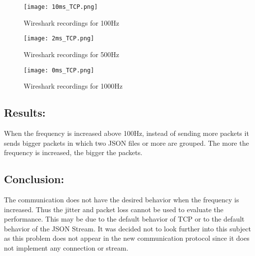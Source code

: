 	\begin{figure}[h]
		\centering
		\texttt{[image: 10ms\_TCP.png]}
		\caption{Wireshark recordings for 100Hz}
		\label{fig:10ms_tcp}
	\end{figure}
	\begin{figure}[h]
		\centering
		\texttt{[image: 2ms\_TCP.png]}
		\caption{Wireshark recordings for 500Hz}
		\label{fig:2ms_tcp}
	\end{figure}
	\begin{figure}[h]
		\centering
		\texttt{[image: 0ms\_TCP.png]}
		\caption{Wireshark recordings for 1000Hz}
		\label{fig:0ms_tcp}
	\end{figure}


\subsection*{Results:}

When the frequency is increased above 100Hz, instead of sending more packets it sends bigger packets in which two \gls{JSON} files or more are grouped. The more the frequency is increased, the bigger the packets. 

\subsection*{Conclusion:}

The communication does not have the desired behavior when the frequency is increased. Thus the jitter and packet loss cannot be used to evaluate the performance. This may be due to the default behavior of TCP or to the default behavior of the JSON Stream. It was decided not to look further into this subject as this problem does not appear in the new communication protocol since it does not implement any connection or stream.